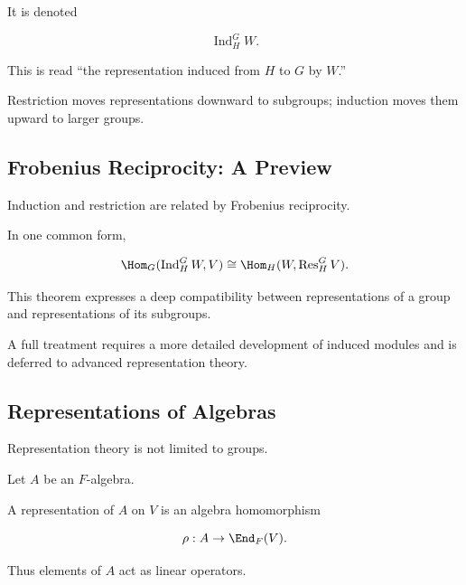 It is denoted

\[ \operatorname{Ind}_H^G W. \]

This is read ``the representation induced from \(H\) to \(G\) by \(W\).''

Restriction moves representations downward to subgroups; induction moves
them upward to larger groups.

\begin{center}
\end{center}

\subsection{Frobenius Reciprocity: A Preview}
\label{subsec:frobenius-reciprocity-preview}

Induction and restriction are related by Frobenius reciprocity.

In one common form,

\[ \Hom_G(\operatorname{Ind}_H^G W,V)
\cong
\Hom_H(W,\operatorname{Res}_H^G V). \]

This theorem expresses a deep compatibility between representations of a
group and representations of its subgroups.

A full treatment requires a more detailed development of induced modules and
is deferred to advanced representation theory.

\subsection{Representations of Algebras}
\label{subsec:representations-of-algebras}

Representation theory is not limited to groups.

Let \(A\) be an \(F\)-algebra.

A representation of \(A\) on \(V\) is an algebra homomorphism

\[ \rho:A\to\End_F(V). \]

Thus elements of \(A\) act as linear operators.

